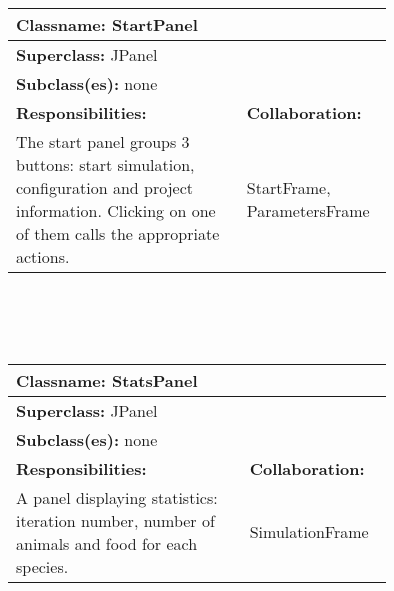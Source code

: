 \documentclass{article}
\begin{document}
\begin{tabular}{|p{0.55\linewidth}|p{0.2\linewidth}|}
\hline
\multicolumn{2}{|l|}{\textbf{Classname:} StartPanel} \\
\hline
\multicolumn{2}{|l|}{\textbf{Superclass:} JPanel} \\
\multicolumn{2}{|l|}{\textbf{Subclass(es):} none} \\
\hline
\textbf{Responsibilities:}  &  \textbf{Collaboration:} \\
The start panel groups 3 buttons: start simulation, configuration and project information. Clicking on one of them calls the appropriate actions. & StartFrame, ParametersFrame \\
\hline
\end{tabular}
\\ \\ \\
\begin{tabular}{|p{0.55\linewidth}|p{0.2\linewidth}|}
\hline
\multicolumn{2}{|l|}{\textbf{Classname:} StatsPanel} \\
\hline
\multicolumn{2}{|l|}{\textbf{Superclass:} JPanel} \\
\multicolumn{2}{|l|}{\textbf{Subclass(es):} none} \\
\hline
\textbf{Responsibilities:}  &  \textbf{Collaboration:} \\
A panel displaying statistics: iteration number, number of animals and food for each species. & SimulationFrame \\
\hline
\end{tabular}
\end{document}
